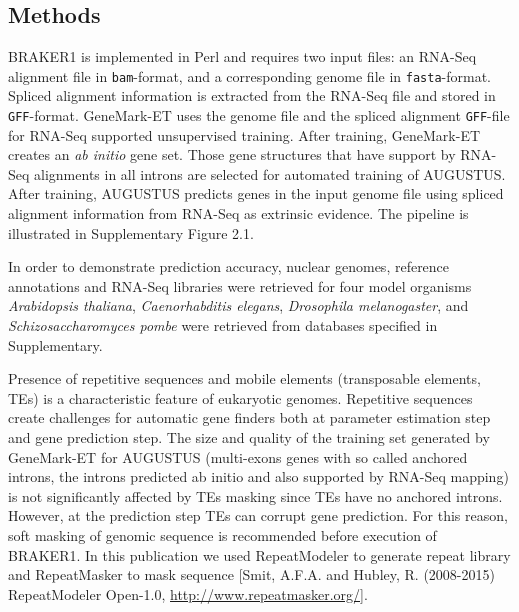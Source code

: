 \documentclass{bioinfo}
\begin{document}
\begin{methods}
\section{Methods}

BRAKER1 is implemented in Perl and requires two input files: an RNA-Seq alignment file in \texttt{bam}-format, and a corresponding genome file in \texttt{fasta}-format. Spliced alignment information is extracted from the RNA-Seq file and stored in \texttt{GFF}-format. GeneMark-ET uses the genome file and  the spliced alignment \texttt{GFF}-file for RNA-Seq supported unsupervised training. After training, GeneMark-ET creates an \textit{ab initio} gene set. Those gene structures that have support by RNA-Seq alignments in all introns are selected for automated training of AUGUSTUS. After training, AUGUSTUS predicts genes in the input genome file using spliced alignment information from RNA-Seq as extrinsic evidence. The pipeline is illustrated in Supplementary Figure 2.1.




In order to demonstrate prediction accuracy, nuclear genomes, reference annotations and RNA-Seq libraries were retrieved for four model organisms \textit{Arabidopsis thaliana}, \textit{Caenorhabditis elegans}, \textit{Drosophila melanogaster}, and \textit{Schizosaccharomyces pombe} were retrieved from databases specified in Supplementary.

Presence of repetitive sequences and mobile elements (transposable elements, TEs) is a characteristic feature of eukaryotic genomes. Repetitive sequences create challenges for automatic gene finders both at parameter estimation step and gene prediction step. The size and quality of the training set generated by GeneMark-ET for AUGUSTUS (multi-exons genes with so called anchored introns, the introns predicted ab initio and also supported by RNA-Seq mapping) is not significantly affected by TEs masking since TEs have no anchored introns. However, at the prediction step TEs can corrupt gene prediction. For this reason, soft masking of genomic sequence is recommended before execution of BRAKER1. In this publication we used RepeatModeler to generate repeat library and RepeatMasker to mask sequence [Smit, A.F.A. and Hubley, R. (2008-2015) RepeatModeler Open-1.0, \url{http://www.repeatmasker.org/}].

\end{methods}
\end{document}
